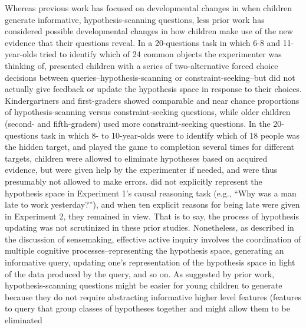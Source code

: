 \documentclass[man,floatsintext]{apa6}
\begin{document}
Whereas previous work has focused on developmental changes in when children generate informative, 
hypothesis-scanning questions, less prior work has considered possible developmental changes in how 
children make use of the new evidence that their questions reveal. 
In a 20-questions task in which 6-8 and 11-year-olds tried to identify which of 24 common objects the experimenter was thinking of,  presented children with a series of two-alternative forced choice decisions between queries--hypothesis-scanning or constraint-seeking--but did not actually give feedback or update the hypothesis space in response to their choices. Kindergartners and first-graders showed comparable and near chance proportions of hypothesis-scanning versus constraint-seeking questions, while older children (second- and fifth-graders) used more constraint-seeking questions. 
In the 20-questions task in which 8- to 10-year-olds were to identify which of 18 people was the hidden target, and played the game to completion several times for different targets, children were allowed to eliminate hypotheses based on acquired evidence, but were given help by the experimenter if needed, and were thus presumably not allowed to make errors.
 did not explicitly represent the hypothesis space in Experiment 1's causal reasoning task (e.g., ``Why was a man late to work yesterday?''), and when ten explicit reasons for being late were given in Experiment 2, they remained in view.  That is to say, the process of hypothesis updating was not scrutinized in these prior studies.
Nonetheless, as described in the discussion of sensemaking, effective active inquiry involves the coordination of multiple cognitive processes--representing the hypothesis space, 
generating an informative query, updating one's representation of the hypothesis space in light of the 
data produced by the query, and so on. As suggested by prior work, hypothesis-scanning questions might 
be easier for young children to generate because they do not require abstracting informative higher level 
features (features to query that group classes of hypotheses together and might allow them to be eliminated 
\end{document}
